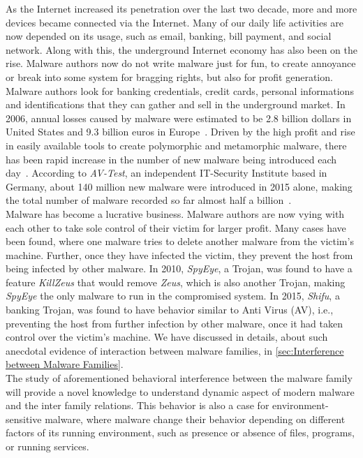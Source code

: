 As the Internet increased its penetration over the last two decade, more and more devices became connected via the Internet.
Many of our daily life activities are now depended on its usage, such as email, banking, bill payment, and social network.
Along with this, the underground Internet economy has also been on the rise.
Malware authors now do not write malware just for fun, to create annoyance or break into some system for bragging rights, but also for profit generation.
Malware authors look for banking credentials, credit cards, personal informations and identifications that they can gather and sell in the underground market.
In 2006, annual losses caused by malware were estimated to be 2.8 billion dollars in United States and 9.3 billion euros in Europe~\cite[]{moore2009economics}.
Driven by the high profit and rise in easily available tools to create polymorphic and metamorphic malware, there has been rapid increase in the number of new malware being introduced each day~\cite[]{tian}.
According to \emph{AV-Test}, an independent IT-Security Institute based in Germany, about 140 million new malware were introduced in 2015 alone, making the total number of malware recorded so far almost half a billion~\cite[]{avtest}.
\\
Malware has become a lucrative business.
Malware authors are now vying with each other to take sole control of their victim for larger profit.
Many cases have been found, where one malware tries to delete another malware from the victim's machine.
Further, once they have infected the victim, they prevent the host from being infected by other malware.
In 2010, \emph{SpyEye}, a Trojan, was found to have a feature \emph{KillZeus} that would remove \emph{Zeus}, which is also another Trojan, making \emph{SpyEye} the only malware to run in the compromised system.
In 2015, \emph{Shifu}, a banking Trojan, was found to have behavior similar to Anti Virus (AV), i.e., preventing the host from further infection by other malware, once it had taken control over the victim's machine.
We have discussed in details, about such anecdotal evidence of interaction between malware families, in \autoref{sec:Interference between Malware Families}.\\
The study of aforementioned behavioral interference between the malware family will provide a novel knowledge to understand dynamic aspect of modern malware and the inter family relations.
This behavior is also a case for environment-sensitive malware, where malware change their behavior depending on different factors of its running environment, such as presence or absence of files, programs, or running services.
